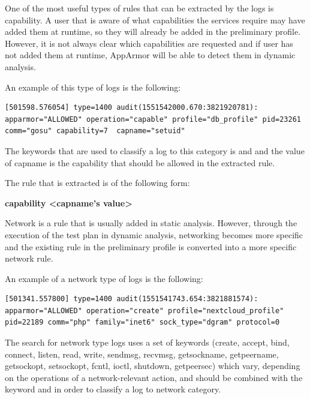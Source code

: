 \begin{description}[style=nextline]
\item[Capabilities]
One of the most useful types of rules that can be extracted by the logs is capability. A user that is aware of what capabilities the services require may have added them at runtime, so they will already be added in the preliminary profile. However, it is not always clear which capabilities are requested and if user has not added them at runtime, AppArmor will be able to detect them in dynamic analysis.

An example of this type of logs is the following:

\begin{lstlisting}[style=dockercommands]
[501598.576054] type=1400 audit(1551542000.670:3821920781): apparmor="ALLOWED" operation="capable" profile="db_profile" pid=23261 comm="gosu" capability=7  capname="setuid"
\end{lstlisting}

The keywords that are used to classify a log to this category is  and  and the value of capname is the capability that should be allowed in the extracted rule.

The rule that is extracted is of the following form:

\textbf{capability \textless capname's value\textgreater}

\item[Network]
Network is a rule that is usually added in static analysis. However, through the execution of the test plan in dynamic analysis, networking becomes more specific and the existing rule in the preliminary profile is converted into a more specific network rule.

An example of a network type of logs is the following:
\begin{lstlisting}[style=dockercommands]
[501341.557800] type=1400 audit(1551541743.654:3821881574): apparmor="ALLOWED" operation="create" profile="nextcloud_profile" pid=22189 comm="php" family="inet6" sock_type="dgram" protocol=0
\end{lstlisting}

The search for network type logs uses a set of keywords (create, accept, bind, connect, listen, read, write, sendmsg, recvmsg, getsockname, getpeername, getsockopt, setsockopt, fcntl, ioctl, shutdown, getpeersec) which vary, depending on the operations of a network-relevant action, and should be combined with the keyword  and  in order to classify a log to network category.


\end{description}
